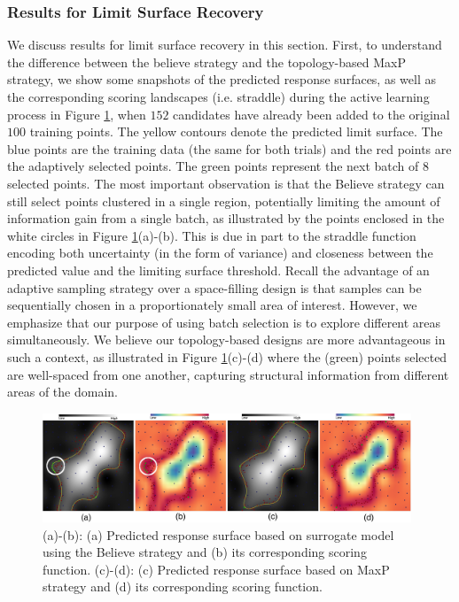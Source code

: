 \subsubsection{Results for Limit Surface Recovery}
\label{sec:limit_results}
We discuss results for limit surface recovery in this section.
%
First, to understand the difference between the believe strategy and the topology-based MaxP strategy, we show some snapshots of the predicted response surfaces, as well as the corresponding scoring landscapes  (i.e. straddle) during the active learning process in Figure \ref{fig:exampleLimits}, when $152$ candidates have already been added to the original $100$ training points.
%
The yellow contours denote the predicted limit surface.
%
The blue points are the training data (the same for both trials) and the red points are the adaptively selected points.
%
The green points represent the next batch of $8$ selected points.
%
The most important observation is that the Believe strategy can still select points clustered in a single region, potentially limiting the amount of information gain from a single batch, as illustrated by the points enclosed in the white circles in Figure \ref{fig:exampleLimits}(a)-(b).
%
This is due in part to the straddle function encoding both uncertainty (in the form of variance) and closeness between the predicted value and the limiting surface threshold.
%
Recall the advantage of an adaptive sampling strategy over a space-filling design is that samples can be sequentially chosen in a proportionately small area of interest.
%
However, we emphasize that our purpose of using batch selection is to explore different areas simultaneously.
%
We believe our topology-based designs are more advantageous in such a context, as illustrated in Figure \ref{fig:exampleLimits}(c)-(d) where the (green) points selected are well-spaced from one another, capturing structural information from different areas of the domain.

\begin{figure}[!ht]
\centering
\includegraphics[width=0.98\textwidth]{figs/chap5/example-limits}
\caption{(a)-(b): (a) Predicted response surface based on surrogate model using
the Believe strategy and (b) its corresponding scoring function.
%
(c)-(d): (c) Predicted response surface based on MaxP strategy and (d) its
corresponding scoring function.}
\label{fig:exampleLimits}
\end{figure}


